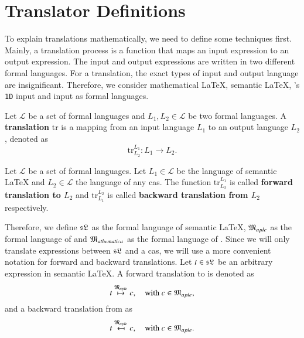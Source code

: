\section{Translator Definitions}\label{sec:definition}
To explain translations mathematically, we need to define some techniques first. Mainly, a translation process is a function that maps an input expression to an output expression. The input and output expressions are written in two different formal languages. For a translation, the exact types of input and output language are insignificant. Therefore, we consider mathematical \LaTeX, semantic \LaTeX, \Maple's \texttt{1D} input and \Mathematica{} input as formal languages. 

\begin{definition}[Translation]
Let $\mathcal{L}$ be a set of formal languages and $L_1, L_2 \in \mathcal{L}$ be two formal languages. A \textbf{translation} $\mathrm{tr}$ is a mapping from an input language $L_1$ to an output language $L_2$, denoted as
\begin{equation*}
\mathrm{tr}^{L_1}_{L_2}: L_1 \rightarrow L_2.
\end{equation*}
\end{definition}

\begin{definition}
Let $\mathcal{L}$ be a set of formal languages. Let $L_1 \in \mathcal{L}$ be the language of semantic \LaTeX{} and $L_2 \in \mathcal{L}$ the language of any \gls{cas}. The function $\mathrm{tr}^{L_1}_{L_2}$ is called \textbf{forward translation to $L_2$} and $\mathrm{tr}^{L_2}_{L_1}$ is called \textbf{backward translation from $L_2$} respectively.
\end{definition}

Therefore, we define $\mathfrak{sL}$ as the formal language of semantic \LaTeX, $\mathfrak{M}_{aple}$ as the formal language of \Maple{} and $\mathfrak{M}_{athematica}$ as the formal language of \Mathematica. Since we will only translate expressions between $\mathfrak{sL}$ and a \gls{cas}, we will use a more convenient notation for forward and backward translations. Let $t \in \mathfrak{sL}$ be an arbitrary expression in semantic \LaTeX{}. A forward translation to \Maple{} is denoted as
\begin{equation}
t \overset{\mathfrak{M}_{aple}}{\mapsto} c, \quad \text{with } c \in \mathfrak{M}_{aple},
\end{equation}
and a backward translation from \Maple{} as
\begin{equation}
t \overset{\mathfrak{M}_{aple}}{\mapsfrom} c, \quad \text{with } c \in \mathfrak{M}_{aple}.
\end{equation}

